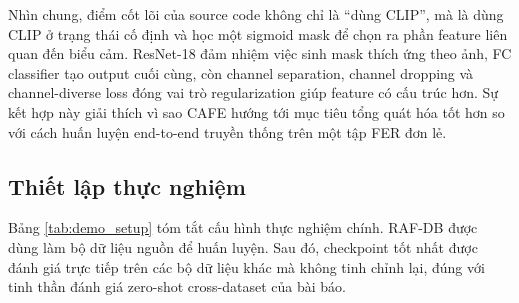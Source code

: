 Nhìn chung, điểm cốt lõi của source code không chỉ là ``dùng CLIP'', mà là dùng CLIP ở trạng thái cố định và học một sigmoid mask để chọn ra phần feature liên quan đến biểu cảm. ResNet-18 đảm nhiệm việc sinh mask thích ứng theo ảnh, FC classifier tạo output cuối cùng, còn channel separation, channel dropping và channel-diverse loss đóng vai trò regularization giúp feature có cấu trúc hơn. Sự kết hợp này giải thích vì sao CAFE hướng tới mục tiêu tổng quát hóa tốt hơn so với cách huấn luyện end-to-end truyền thống trên một tập FER đơn lẻ.


\subsection{Thiết lập thực nghiệm}

Bảng \ref{tab:demo_setup} tóm tắt cấu hình thực nghiệm chính. RAF-DB được dùng làm bộ dữ liệu nguồn để huấn luyện. Sau đó, checkpoint tốt nhất được đánh giá trực tiếp trên các bộ dữ liệu khác mà không tinh chỉnh lại, đúng với tinh thần đánh giá zero-shot cross-dataset của bài báo.

